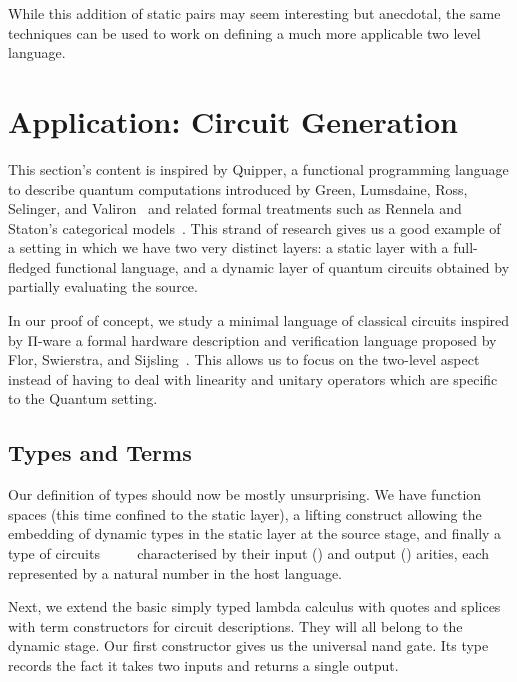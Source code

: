 While this addition of static pairs may seem interesting
but anecdotal, the same techniques can be used to work on
defining a much more applicable two level language.

\section{Application: Circuit Generation}\label{sec:circuits}

This section's content is inspired by Quipper, a functional
programming language to describe quantum computations
introduced by Green, Lumsdaine, Ross, Selinger, and
Valiron~\cite{DBLP:conf/rc/GreenLRSV13} and related
formal treatments such as Rennela and Staton's categorical
models~\cite{DBLP:journals/lmcs/RennelaS19}.
%
This strand of research gives us a good example of a setting in which
we have two very distinct layers: a static layer with a
full-fledged functional language, and a dynamic layer of
quantum circuits obtained by partially evaluating the source.

In our proof of concept, we study a minimal language of
classical circuits inspired by Π-ware a formal hardware
description and verification language proposed by
Flor, Swierstra, and Sijsling~\cite{DBLP:conf/types/FlorSS15}.
%
This allows us to focus on the two-level aspect instead of
having to deal with linearity and unitary operators which are
specific to the Quantum setting.

\subsection{Types and Terms}

Our definition of types should now be mostly unsurprising.
We have function spaces (this time confined to the static
layer), a lifting construct allowing the embedding of
dynamic types in the static layer at the source stage,
and finally a type of circuits
~~~~ characterised by
their input () and output () arities,
each represented by a natural number in the host language.


Next, we extend the basic simply typed lambda calculus with
quotes and splices with term constructors for circuit descriptions.
They will all belong to the dynamic stage.
%
Our first constructor gives us the universal nand gate.
Its type records the fact it takes two inputs and returns
a single output.

